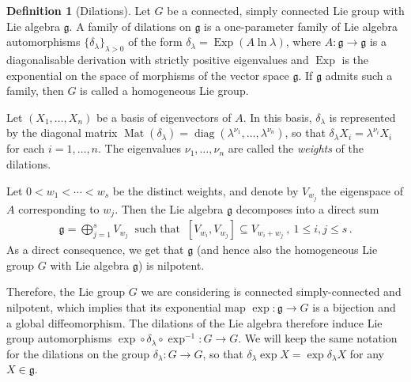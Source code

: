 \documentclass[dvipsnames]{amsart}
\theoremstyle{definition}
\newtheorem{definition}[theorem]{Definition}
\theoremstyle{definition}
\numberwithin{equation}{section}
\begin{document}
\begin{definition}[Dilations]\label{def: dilations}
    Let \(G\) be a connected, simply connected Lie group with Lie algebra
\(\mathfrak g\). A family of dilations on \(\mathfrak g\) is a
one-parameter family of Lie algebra automorphisms
$\{ \delta_\lambda\}_{\lambda>0}$
of the form $\delta_\lambda=\operatorname{Exp}(A\ln\lambda)$,
where \(A:\mathfrak g\to\mathfrak g\) is a diagonalisable derivation
with strictly positive eigenvalues and $\operatorname{Exp}$ is the exponential on the space of morphisms of the vector space $\mathfrak{g}$. If \(\mathfrak g\) admits such a
family, then \(G\) is called a homogeneous Lie group.

    Let $(X_1,\ldots,X_n)$ be a basis of eigenvectors of $A$. In this basis, $\delta_\lambda$ is represented by the diagonal matrix $\operatorname{Mat}(\delta_\lambda)=\operatorname{diag}(\lambda^{\nu_1},\ldots,\lambda^{\nu_n})$, so that $\delta_\lambda X_i=\lambda^{\nu_i}X_i$ for each $i=1,\ldots,n$. The eigenvalues $\nu_1,\ldots,\nu_n$ are called the \textit{weights} of the dilations.
    \end{definition}

    Let $0<w_1<\cdots<w_s$
be the distinct weights, and denote by \(V_{w_j}\) the
eigenspace of \(A\) corresponding to \(w_j\). Then the Lie algebra $\mathfrak{g}$ decomposes into a direct sum
\begin{align}\label{eq: direct sum decomp}
        \mathfrak{g}=\bigoplus_{j=1}^sV_{w_j}\ \text{ such that }\ [V_{w_i},V_{w_j}]\subseteq V_{w_i+w_j}\ ,\ 1\le i,j\le s\,.
    \end{align}
    As a direct consequence, we get that $\mathfrak{g}$ (and hence also the homogeneous Lie group $G$ with Lie algebra $\mathfrak{g}$) is nilpotent. 

    Therefore, the Lie group $G$ we are considering is connected simply-connected and nilpotent, which implies that its exponential map $\exp\colon\mathfrak{g}\to G$ is a bijection and a global diffeomorphism. 
    The dilations of the Lie algebra therefore
induce Lie group automorphisms $\exp\circ\delta_\lambda\circ\exp^{-1}\colon G\longrightarrow G$. We will keep the same notation for the dilations on the group $\delta_\lambda\colon G\to G$, so that $\delta_\lambda\exp X=\exp\delta_\lambda X$ for any $X\in\mathfrak{g}$.
    
\end{document}
